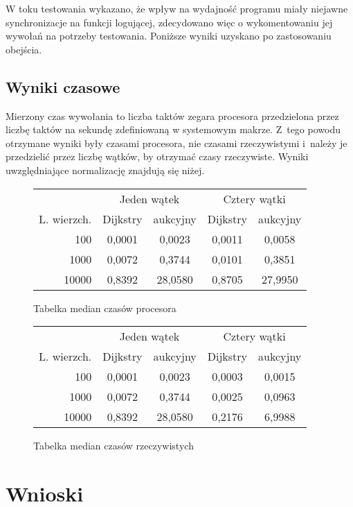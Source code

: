 \documentclass {article}
\begin{document}
W toku testowania wykazano, że wpływ na wydajność programu miały niejawne synchronizacje na funkcji logującej, zdecydowano więc o wykomentowaniu jej wywołań na potrzeby testowania. Poniższe wyniki uzyskano po zastosowaniu obejścia.

\subsection{Wyniki czasowe}

Mierzony czas wywołania to liczba taktów zegara procesora przedzielona przez liczbę taktów na sekundę zdefiniowaną w systemowym makrze. Z~tego powodu otrzymane wyniki były czasami procesora, nie czasami rzeczywistymi i~należy je przedzielić przez liczbę wątków, by otrzymać czasy rzeczywiste. Wyniki uwzględniające normalizację znajdują się niżej.

\begin{figure}[H]
\centering
\begin{tabular}{r|cc|cc}
 & \multicolumn{2}{c}{Jeden wątek}  & \multicolumn{2}{c}{Cztery wątki} \\
L. wierzch. & Dijkstry & aukcyjny & Dijkstry & aukcyjny \\
\hline
100   & 0,0001 & 0,0023 & 0,0011 & 0,0058 \\
1000  & 0,0072 & 0,3744 & 0,0101 & 0,3851 \\
10000 & 0,8392 & 28,0580 & 0,8705 & 27,9950  
\end{tabular}
\caption{Tabelka median czasów procesora}
\end{figure}

\begin{figure}[H]
\centering
\begin{tabular}{r|cc|cc}
 & \multicolumn{2}{c}{Jeden wątek}  & \multicolumn{2}{c}{Cztery wątki} \\
L. wierzch. & Dijkstry & aukcyjny & Dijkstry & aukcyjny \\
\hline
100   & 0,0001 & 0,0023 & 0,0003 & 0,0015 \\
1000  & 0,0072 & 0,3744 & 0,0025 & 0,0963 \\
10000 & 0,8392 & 28,0580 & 0,2176 & 6,9988
\end{tabular}
\caption{Tabelka median czasów rzeczywistych}
\end{figure}

\section{Wnioski}
\end{document}
